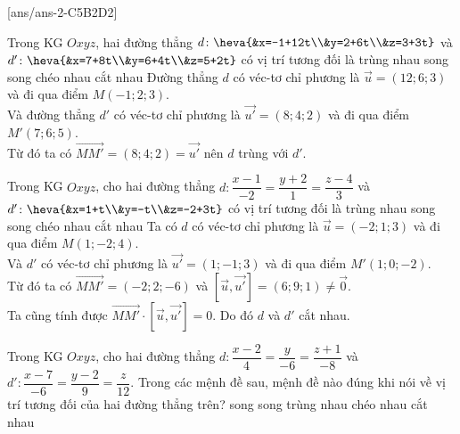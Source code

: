 [ans/ans-2-C5B2D2]
\TN
\begin{ex}%
Trong KG $Oxyz$, hai đường thẳng $d \colon \heva{&x=-1+12t\\&y=2+6t\\&z=3+3t}$ và  $d' \colon \heva{&x=7+8t\\&y=6+4t\\&z=5+2t}$ có vị trí tương đối là
	\choice
	{\True trùng nhau}
	{song song}
	{chéo nhau}
	{cắt nhau}
	\loigiai
	{Đường thẳng $d$ có véc-tơ chỉ phương là  $\overrightarrow{u}=(12;6;3)$ và đi qua điểm $M(-1;2;3)$.\\
	Và đường thẳng $d'$ có véc-tơ chỉ phương là  $\overrightarrow{u'}=(8;4;2)$ và đi qua điểm $M'(7;6;5)$.\\
	Từ đó ta có $\overrightarrow{MM'}=(8;4;2)=\overrightarrow{u'}$ nên $d$ trùng với $d'$.}
	\end{ex}
\begin{ex}%
	Trong KG $Oxyz$, cho hai đường thẳng $d \colon \dfrac{x-1}{-2}=\dfrac{y+2}{1}=\dfrac{z-4}{3}$ và  $ d' \colon \heva{&x=1+t\\&y=-t\\&z=-2+3t}$ có vị trí tương đối là
	\choice
	{trùng nhau}
	{song song}
	{chéo nhau}
	{\True  cắt nhau}
	\loigiai
	{Ta có 	$d$ có véc-tơ chỉ phương là  $\overrightarrow{u}=(-2;1;3)$ và đi qua điểm $M(1;-2;4)$.\\
		Và $d'$ có véc-tơ chỉ phương là  $\overrightarrow{u'}=(1;-1;3)$ và đi qua điểm $M'(1;0;-2)$.\\
		Từ đó ta có $\overrightarrow{MM'}=(-2;2;-6)$ và $ \left[\overrightarrow{u},\overrightarrow{u'} \right]=(6;9;1)\ne \overrightarrow{0}$. \\
		Ta cũng tính được $ \overrightarrow{MM'} \cdot \left[\overrightarrow{u},\overrightarrow{u'} \right]=0$. Do đó $d$ và $d'$ cắt nhau.}
\end{ex}
\begin{ex}%
	Trong KG $Oxyz$, cho hai đường thẳng $d\colon \dfrac{x-2}{4}=\dfrac{y}{-6}=\dfrac{z+1}{-8}$ và $d'\colon \dfrac{x-7}{-6}=\dfrac{y-2}{9}=\dfrac{z}{12}$. Trong các mệnh đề sau, mệnh đề nào đúng khi nói về vị trí tương đối của hai đường thẳng trên?
	\choice
	{\True song song}
	{trùng nhau}
	c{héo nhau}
	{cắt nhau}
\end{ex}
